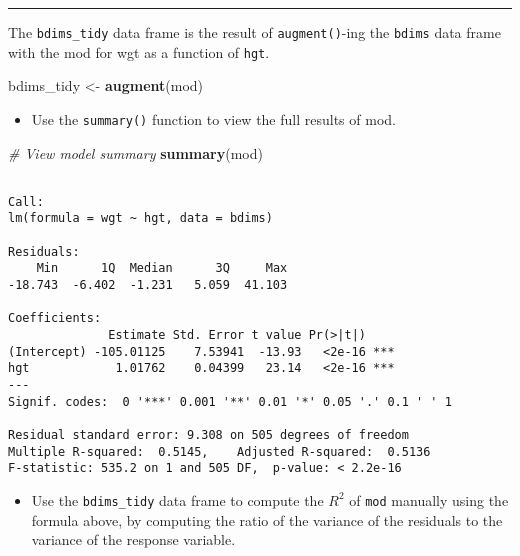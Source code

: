 \documentclass[
]{book}
\newenvironment{Shaded}{\begin{snugshade}}{\end{snugshade}}
\newcommand{\CommentTok}[1]{\textcolor[rgb]{0.56,0.35,0.01}{\textit{#1}}}
\newcommand{\KeywordTok}[1]{\textcolor[rgb]{0.13,0.29,0.53}{\textbf{#1}}}
\newcommand{\NormalTok}[1]{#1}
\newcommand{\StringTok}[1]{\textcolor[rgb]{0.31,0.60,0.02}{#1}}
\providecommand{\tightlist}{%
  \setlength{\itemsep}{0pt}\setlength{\parskip}{0pt}}
\begin{document}
\begin{center}\rule{0.5\linewidth}{0.5pt}\end{center}

The \texttt{bdims\_tidy} data frame is the result of \texttt{augment()}-ing the \texttt{bdims} data frame with the mod for wgt as a function of \texttt{hgt}.

\begin{Shaded}
\begin{Highlighting}[]
\NormalTok{bdims_tidy <-}\StringTok{ }\KeywordTok{augment}\NormalTok{(mod)}
\end{Highlighting}
\end{Shaded}

\begin{itemize}
\tightlist
\item
  Use the \texttt{summary()} function to view the full results of mod.
\end{itemize}

\begin{Shaded}
\begin{Highlighting}[]
\CommentTok{# View model summary}
\KeywordTok{summary}\NormalTok{(mod)}
\end{Highlighting}
\end{Shaded}

\begin{verbatim}

Call:
lm(formula = wgt ~ hgt, data = bdims)

Residuals:
    Min      1Q  Median      3Q     Max 
-18.743  -6.402  -1.231   5.059  41.103 

Coefficients:
              Estimate Std. Error t value Pr(>|t|)    
(Intercept) -105.01125    7.53941  -13.93   <2e-16 ***
hgt            1.01762    0.04399   23.14   <2e-16 ***
---
Signif. codes:  0 '***' 0.001 '**' 0.01 '*' 0.05 '.' 0.1 ' ' 1

Residual standard error: 9.308 on 505 degrees of freedom
Multiple R-squared:  0.5145,    Adjusted R-squared:  0.5136 
F-statistic: 535.2 on 1 and 505 DF,  p-value: < 2.2e-16
\end{verbatim}

\begin{itemize}
\tightlist
\item
  Use the \texttt{bdims\_tidy} data frame to compute the \(R^2\) of \texttt{mod} manually using the formula above, by computing the ratio of the variance of the residuals to the variance of the response variable.
\end{itemize}
\end{document}
